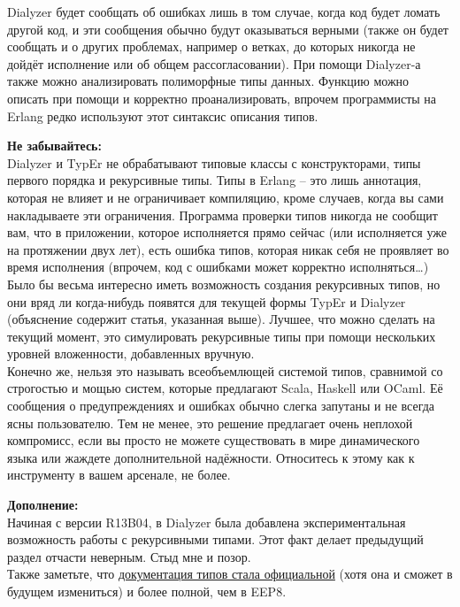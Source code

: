 Dialyzer будет сообщать об ошибках лишь в том случае, когда код будет ломать другой код, и эти сообщения обычно будут оказываться верными (также он будет сообщать и о других проблемах, например о ветках, до которых никогда не дойдёт исполнение или об общем рассогласовании). При помощи Dialyzer\--а также можно анализировать полиморфные типы данных. Функцию  можно описать при помощи  и корректно проанализировать, впрочем программисты на Erlang редко используют этот синтаксис описания типов.\\
\colorbox{lorange}
{
    \begin{minipage}{\linewidth}
        \textbf{Не забывайтесь:}\\
Dialyzer и TypEr не обрабатывают типовые классы с конструкторами, типы первого порядка и рекурсивные типы. Типы в Erlang \--- это лишь аннотация, которая не влияет и не ограничивает компиляцию, кроме случаев, когда вы сами накладываете эти ограничения. Программа проверки типов никогда не сообщит вам, что в приложении, которое исполняется прямо сейчас (или исполняется уже на протяжении двух лет), есть ошибка типов, которая никак себя не проявляет во время исполнения (впрочем, код с ошибками может корректно исполняться\ldots)\\
Было бы весьма интересно иметь возможность создания рекурсивных типов, но они вряд ли когда\--нибудь появятся для текущей формы TypEr и Dialyzer (объяснение содержит статья, указанная выше). Лучшее, что можно сделать на текущий момент, это симулировать рекурсивные типы при помощи нескольких уровней вложенности, добавленных вручную.\\
Конечно же, нельзя это называть всеобъемлющей системой типов, сравнимой со строгостью и мощью систем, которые предлагают Scala, Haskell или OCaml. Её сообщения о предупреждениях и ошибках обычно слегка запутаны и не всегда ясны пользователю. Тем не менее, это решение предлагает очень неплохой компромисс, если вы просто не можете существовать в мире динамического языка или жаждете дополнительной надёжности. Относитесь к этому как к инструменту в вашем арсенале, не более.
    \end{minipage}
}
\colorbox{lgray}
{
    \begin{minipage}{\linewidth}
\textbf{Дополнение:}\\
Начиная с версии R13B04, в Dialyzer была добавлена экспериментальная возможность работы с рекурсивными типами. Этот факт делает предыдущий раздел отчасти неверным. Стыд мне и позор.\\
Также заметьте, что \href{http://erlang.org/doc/reference\_manual/typespec.html}{документация типов стала официальной} (хотя она и сможет в будущем измениться) и более полной, чем в EEP8.
    \end{minipage}
}
